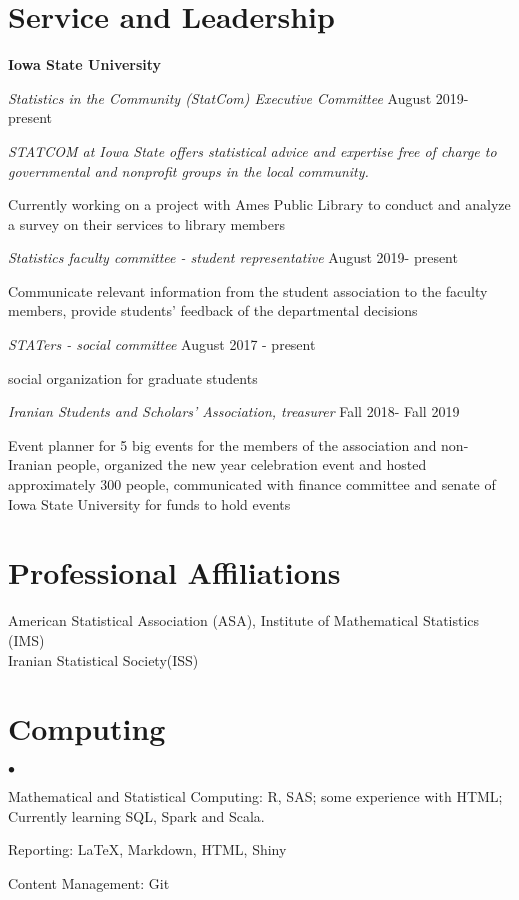 \documentclass[margin,line]{res}
\newenvironment{list2}{
  \begin{list}{$\bullet$}{%
      \setlength{\itemsep}{0in}
      \setlength{\parsep}{0in} \setlength{\parskip}{0in}
      \setlength{\topsep}{0in} \setlength{\partopsep}{0in}
      \setlength{\leftmargin}{0.2in}}}{\end{list}}
\begin{document}
\begin{resume}
\section{\sc Service and Leadership}

{\bf Iowa State University}


{\em Statistics in the Community (StatCom) Executive Committee} \hfill {August 2019- present}

\vspace{-0.3cm}
{\em STATCOM at Iowa State offers statistical advice and expertise free of charge to governmental and nonprofit groups in the local community.
	
\vspace{-0.3cm}
Currently working on a project with Ames Public Library to conduct and analyze a survey on their services to library members}

\vspace{-0.3cm}
{\em Statistics faculty committee - student representative	} \hfill {August 2019- present }

\vspace{-0.3cm}
Communicate relevant information from the student association to the faculty members, provide students’ feedback of the departmental decisions 

{\em STATers - social committee } \hfill {August 2017 - present}

\vspace{-0.3cm}
social organization for graduate students

{\em Iranian Students and Scholars' Association, treasurer} \hfill {Fall 2018- Fall 2019}

\vspace{-0.3cm}
Event planner for 5 big events for the members of the association and non-Iranian people, organized the new year celebration event and hosted approximately 300 people, communicated with finance committee and senate of Iowa State University for funds to hold events




\section{\sc Professional Affiliations}
American Statistical Association (ASA), Institute of Mathematical Statistics (IMS)\\
Iranian Statistical Society(ISS)


\section{\sc Computing}
\begin{list2}
\newcommand{\latex}{\LaTeX\xspace}	
\item Mathematical and Statistical Computing:  R, SAS; some experience with HTML;\\
 Currently learning  SQL, Spark and Scala.
\item Reporting:  \LaTeX, Markdown, HTML, Shiny
\item Content Management: Git




\end{list2}
\end{resume}
\end{document}
